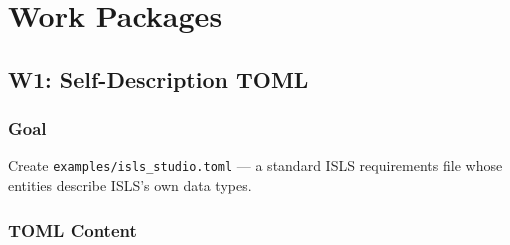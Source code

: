 \documentclass[11pt,a4paper]{article}
\begin{document}
\section{Work Packages}

\subsection{W1: Self-Description TOML}
\label{sec:w1}

\subsubsection{Goal}

Create \texttt{examples/isls\_studio.toml} --- a standard ISLS
requirements file whose entities describe ISLS's own data types.

\subsubsection{TOML Content}
\end{document}

